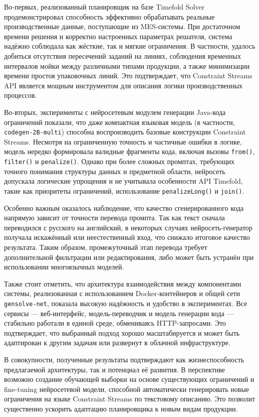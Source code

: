 Во-первых, реализованный планировщик на базе Timefold Solver продемонстрировал способность эффективно обрабатывать реальные производственные данные, поступающие из MES-системы. При достаточном времени решения и корректно настроенных параметрах решателя, система надёжно соблюдала как жёсткие, так и мягкие ограничения. В частности, удалось добиться отсутствия пересечений заданий на линиях, соблюдения временных интервалов мойки между различными типами продукции, а также минимизации времени простоя упаковочных линий. Это подтверждает, что Constraint Streams API является мощным инструментом для описания логики производственных процессов.

Во-вторых, эксперименты с нейросетевым модулем генерации Java-кода ограничений показали, что даже компактная языковая модель (в частности, \texttt{codegen-2B-multi}) способна воспроизводить базовые конструкции Constraint Streams. Несмотря на ограниченную точность и частичные ошибки в логике, модель нередко формировала валидные фрагменты кода, включая вызовы \texttt{from()}, \texttt{filter()} и \texttt{penalize()}. Однако при более сложных промптах, требующих точного понимания структуры данных и предметной области, нейросеть допускала логические упрощения и не учитывала особенности API Timefold, такие как приоритеты ограничений, использование \texttt{penalizeLong()} и \texttt{join()}.

Особенно важным оказалось наблюдение, что качество сгенерированного кода напрямую зависит от точности перевода промпта. Так как текст сначала переводился с русского на английский, в некоторых случаях нейросеть-генератор получала искажённый или неестественный вход, что снижало итоговое качество результата. Таким образом, промежуточный этап перевода требует дополнительной фильтрации или редактирования, либо может быть устранён при использовании многоязычных моделей.

Также стоит отметить, что архитектура взаимодействия между компонентами системы, реализованная с использованием Docker-контейнеров и общей сети \texttt{gensolve-net}, показала высокую надёжность и удобство в экспериментах. Все сервисы — веб-интерфейс, модель-переводчик и модель генерации кода — стабильно работали в единой среде, обмениваясь HTTP-запросами. Это подтверждает, что выбранный подход хорошо масштабируется и может быть адаптирован к другим задачам или развернут в облачной инфраструктуре.

В совокупности, полученные результаты подтверждают как жизнеспособность предлагаемой архитектуры, так и потенциал её развития. В перспективе возможно создание обучающей выборки на основе существующих ограничений и fine-tuning нейросетевой модели, способной автоматически генерировать новые ограничения на языке Constraint Streams по текстовому описанию. Это позволит существенно ускорить адаптацию планировщика к новым видам продукции.
